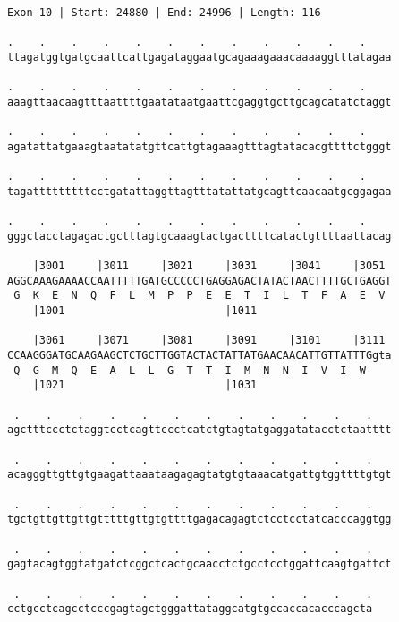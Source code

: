 \documentclass{article}
\begin{document}
\newpage
\begin{Verbatim}
Exon 10 | Start: 24880 | End: 24996 | Length: 116
 
.    .    .    .    .    .    .    .    .    .    .    .    
ttagatggtgatgcaattcattgagataggaatgcagaaagaaacaaaaggtttatagaa
  
.    .    .    .    .    .    .    .    .    .    .    .    
aaagttaacaagtttaattttgaatataatgaattcgaggtgcttgcagcatatctaggt
  
.    .    .    .    .    .    .    .    .    .    .    .    
agatattatgaaagtaatatatgttcattgtagaaagtttagtatacacgttttctgggt
  
.    .    .    .    .    .    .    .    .    .    .    .    
tagatttttttttcctgatattaggttagtttatattatgcagttcaacaatgcggagaa
  
.    .    .    .    .    .    .    .    .    .    .    .    
gggctacctagagactgctttagtgcaaagtactgacttttcatactgttttaattacag
  
    |3001     |3011     |3021     |3031     |3041     |3051 
AGGCAAAGAAAACCAATTTTTGATGCCCCCTGAGGAGACTATACTAACTTTTGCTGAGGT
 G  K  E  N  Q  F  L  M  P  P  E  E  T  I  L  T  F  A  E  V 
    |1001                         |1011                     
  
    |3061     |3071     |3081     |3091     |3101     |3111 
CCAAGGGATGCAAGAAGCTCTGCTTGGTACTACTATTATGAACAACATTGTTATTTGgta
 Q  G  M  Q  E  A  L  L  G  T  T  I  M  N  N  I  V  I  W    
    |1021                         |1031                     
  
 .    .    .    .    .    .    .    .    .    .    .    .   
agctttccctctaggtcctcagttccctcatctgtagtatgaggatatacctctaatttt
  
 .    .    .    .    .    .    .    .    .    .    .    .   
acagggttgttgtgaagattaaataagagagtatgtgtaaacatgattgtggttttgtgt
  
 .    .    .    .    .    .    .    .    .    .    .    .   
tgctgttgttgttgtttttgttgtgttttgagacagagtctcctcctatcacccaggtgg
  
 .    .    .    .    .    .    .    .    .    .    .    .   
gagtacagtggtatgatctcggctcactgcaacctctgcctcctggattcaagtgattct
  
 .    .    .    .    .    .    .    .    .    .    .    .
cctgcctcagcctcccgagtagctgggattataggcatgtgccaccacacccagcta
\end{Verbatim}
\newpage
\end{document}
